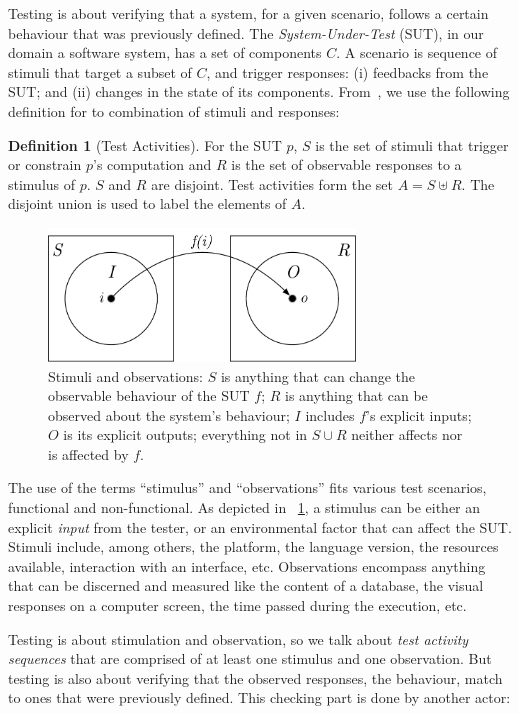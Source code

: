 \documentclass[11pt]{sdm_internship}
\theoremstyle{definition}
\newtheorem{definition}{Definition}[section]
\begin{document}
Testing is about verifying that a system, for a given scenario, follows a certain behaviour that was previously defined.
The \emph{System-Under-Test} (SUT), in our domain a software system, has a set of components $C$.
A scenario is sequence of stimuli that target a subset of $C$, and trigger responses: (i) feedbacks from the SUT\@; and (ii) changes in the state of its components.
From~\cite{barr2015oracle}, we use the following definition for to combination of stimuli and responses:

\begin{definition}[Test Activities]
  For the SUT $p$, $S$ is the set of stimuli that trigger or constrain $p$'s computation and $R$ is the set of observable responses to a stimulus of $p$.
  $S$ and $R$ are disjoint.
  Test activities form the set $A = S\uplus{}R$.
  The disjoint union is used to label the elements of $A$.
\end{definition}

\begin{figure}
  \centering
  \includegraphics[width=22em]{stim_and_obs}
  \caption{Stimuli and observations: $S$ is anything that can change the observable behaviour of the SUT $f$; $R$ is anything that can be observed about the system's behaviour; $I$ includes $f$'s explicit inputs; $O$ is its explicit outputs; everything not in $S \cup R$ neither affects nor is affected by $f$.}%
  \label{fig:test_activity}
\end{figure}

The use of the terms ``stimulus'' and ``observations'' fits various test scenarios, functional and non-functional.
As depicted in \figurename~\ref{fig:test_activity}, a stimulus can be either an explicit \emph{input} from the tester, or an environmental factor that can affect the SUT\@.
Stimuli include, among others, the platform, the language version, the resources available, interaction with an interface, etc.
Observations encompass anything that can be discerned and measured like the content of a database, the visual responses on a computer screen, the time passed during the execution, etc.

Testing is about stimulation and observation, so we talk about \emph{test activity sequences} that are comprised of at least one stimulus and one observation.
But testing is also about verifying that the observed responses, the behaviour, match to ones that were previously defined.
This checking part is done by another actor:
\end{document}
